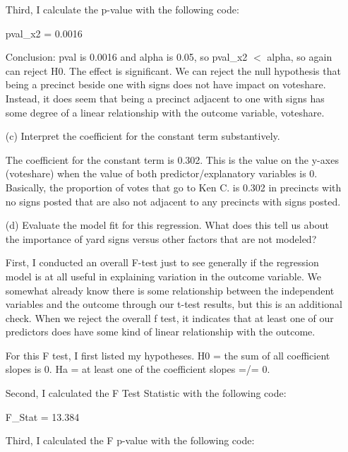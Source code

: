 \documentclass[12pt,letterpaper]{article}
\begin{document}
\begin{enumerate}
	Third, I calculate the p-value with the following code:
	
	
	pval\_x2 = 0.0016
	
	Conclusion: pval is 0.0016 and alpha is 0.05, so pval\_x2 $<$ alpha, so again can reject H0. The effect is significant.
	We can reject the null hypothesis that being a precinct beside one with signs does not have impact
	on voteshare. Instead, it does seem that being a precinct adjacent to one with signs has some degree of a linear relationship with the outcome variable, voteshare.
	
	\vspace{2cm}
	\item [(c)] Interpret the coefficient for the constant term substantively.
	
	The coefficient for the constant term is 0.302. This is the value on the y-axes (voteshare) when the value of both predictor/explanatory variables is 0. Basically, the proportion of votes that go to Ken C. is 0.302 in precincts with no signs posted that are also not adjacent to any precincts with signs posted.
	
	\vspace{10cm}
	
	\item [(d)] Evaluate the model fit for this regression.  What does this	tell us about the importance of yard signs versus other factors that are not modeled?
	
	First, I conducted an overall F-test just to see generally if the regression model is at all useful in explaining variation in the outcome variable. We somewhat already know there is some relationship between the independent variables and the outcome through our t-test results, but this is an additional check. When we reject the overall f test, it indicates that at least one of our predictors does have some kind of linear relationship with the outcome. 
	
	For this F test, I first listed my hypotheses. H0 = the sum of all coefficient slopes is 0. Ha = at least one of the coefficient slopes =/= 0.
	
	Second, I calculated the F Test Statistic with the following code:
	
	
	
	F\_Stat = 13.384
	
	Third, I calculated the F p-value with the following code:
	

\end{enumerate}
\end{document}
